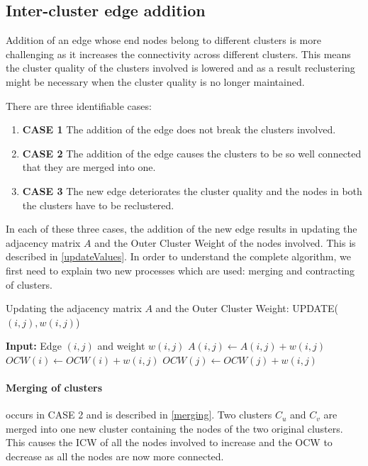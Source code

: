 \subsection{Inter-cluster edge addition}

Addition of an edge whose end nodes belong to different clusters is more challenging as it increases the connectivity across different clusters. This means the cluster quality of the clusters involved is lowered and as a result reclustering might be necessary when the cluster quality is no longer maintained. 

There are three identifiable cases:

\begin{enumerate}
	\item \textbf{CASE 1} The addition of the edge does not break the clusters involved.
	\item \textbf{CASE 2} The addition of the edge causes the clusters to be so well connected that they are merged into one.
	\item \textbf{CASE 3} The new edge deteriorates the cluster quality and the nodes in both the clusters have to be reclustered.
\end{enumerate}

In each of these three cases, the addition of the new edge results in updating the adjacency matrix $A$ and the Outer Cluster Weight of the nodes involved. This is described in \autoref{updateValues}. In order to understand the complete algorithm, we first need to explain two new processes which are used: merging and contracting of clusters.

\begin{algorithm}
\caption{Updating the adjacency matrix $A$ and the Outer Cluster Weight: UPDATE($(i,j),w(i,j)$)}
\label{merging}
\begin{algorithmic}
\STATE \textbf{Input:} Edge $(i,j)$ and weight $w(i,j)$
\STATE $A(i,j) \leftarrow A(i,j) + w(i,j)$
\STATE $OCW(i) \leftarrow OCW(i) + w(i,j)$
\STATE $OCW(j) \leftarrow OCW(j) + w(i,j)$
\end{algorithmic}
\end{algorithm}

\paragraph{Merging of clusters} occurs in CASE 2 and is described in \autoref{merging}. Two clusters $C_u$ and $C_v$ are merged into one new cluster containing the nodes of the two original clusters. This causes the ICW of all the nodes involved to increase and the OCW to decrease as all the nodes are now more connected.

